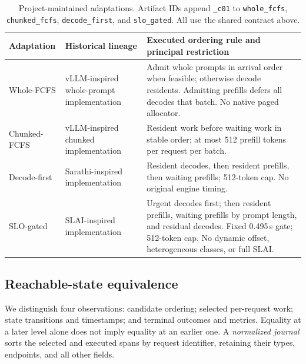 \begin{table}[t]
\caption{Project-maintained adaptations. Artifact IDs append \texttt{\_c01}
to \texttt{whole\_fcfs}, \texttt{chunked\_fcfs}, \texttt{decode\_first}, and
\texttt{slo\_gated}. All use the shared contract above.}
\label{tab:policies}\small
\begin{tabularx}{\linewidth}{@{}p{.18\linewidth}p{.20\linewidth}X@{}}\toprule
Adaptation & Historical lineage & Executed ordering rule and principal restriction \\\midrule
Whole-FCFS & vLLM-inspired whole-prompt implementation & Admit whole prompts in arrival order when feasible; otherwise decode residents. Admitting prefills defers all decodes that batch. No native paged allocator. \\
Chunked-FCFS & vLLM-inspired chunked implementation & Resident work before waiting work in stable order; at most 512 prefill tokens per request per batch. \\
Decode-first & Sarathi-inspired implementation & Resident decodes, then resident prefills, then waiting prefills; 512-token cap. No original engine timing. \\
SLO-gated & SLAI-inspired implementation & Urgent decodes first; then resident prefills, waiting prefills by prompt length, and residual decodes. Fixed 0.495\,s gate; 512-token cap. No dynamic offset, heterogeneous classes, or full SLAI. \\\bottomrule
\end{tabularx}
\end{table}

\subsection{Reachable-state equivalence}\label{sec:equivalence}
We distinguish four observations: candidate ordering; selected per-request
work; state transitions and timestamps; and terminal outcomes and metrics.
Equality at a later level alone does not imply equality at an earlier one.
A \emph{normalized journal} sorts the selected and executed spans by request
identifier, retaining their types, endpoints, and all other fields.

